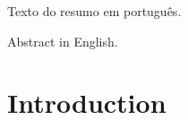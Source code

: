 \documentclass[a4paper,12pt,oneside,onecolumn,final,fleqn]{config/repUERJ}
\begin{document}
%

Texto do resumo em português.\\

\imprimirchaves%

%

Abstract in English.\\

\printkeys%
\listadefiguras%



\sumario%
\mainmatter%
\chapter*{Introduction}%
\label{ch:intro}%

\end{document}
